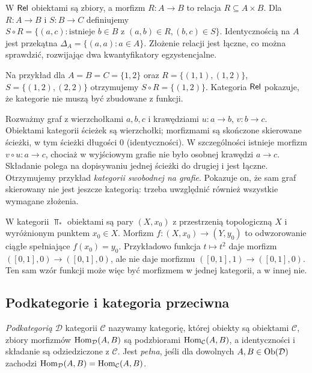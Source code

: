 \begin{przyklad}
W $\mathsf{Rel}$ obiektami są zbiory, a morfizm $R:A\to B$ to relacja $R\subseteq A\times B$. Dla $R:A\to B$ i $S:B\to C$ definiujemy $S\circ R=\{(a,c):\text{istnieje }b\in B\text{ z }(a,b)\in R,(b,c)\in S\}$. Identycznością na $A$ jest przekątna $\Delta_A=\{(a,a):a\in A\}$. Złożenie relacji jest łączne, co można sprawdzić, rozwijając dwa kwantyfikatory egzystencjalne.

Na przykład dla $A=B=C=\{1,2\}$ oraz $R=\{(1,1),(1,2)\}$, $S=\{(1,2),(2,2)\}$ otrzymujemy $S\circ R=\{(1,2)\}$. Kategoria $\mathsf{Rel}$ pokazuje, że kategorie nie muszą być zbudowane z funkcji.
\end{przyklad}


\begin{przyklad}\label{przyklad:sciezki}
Rozważmy graf z wierzchołkami $a,b,c$ i krawędziami $u:a\to b$, $v:b\to c$. Obiektami kategorii ścieżek są wierzchołki; morfizmami są skończone skierowane ścieżki, w tym ścieżki długości $0$ (identyczności). W szczególności istnieje morfizm $v\circ u:a\to c$, chociaż w wyjściowym grafie nie było osobnej krawędzi $a\to c$. Składanie polega na dopisywaniu jednej ścieżki do drugiej i jest łączne. Otrzymujemy przykład \emph{kategorii swobodnej na grafie}. Pokazuje on, że sam graf skierowany nie jest jeszcze kategorią: trzeba uwzględnić również wszystkie wymagane złożenia.
\end{przyklad}

\begin{przyklad}
W kategorii $\Top_*$ obiektami są pary $(X,x_0)$ z przestrzenią topologiczną $X$ i wyróżnionym punktem $x_0\in X$. Morfizm $f:(X,x_0)\to(Y,y_0)$ to odwzorowanie ciągłe spełniające $f(x_0)=y_0$. Przykładowo funkcja $t\mapsto t^2$ daje morfizm $([0,1],0)\to([0,1],0)$, ale nie daje morfizmu $([0,1],1)\to([0,1],0)$. Ten sam wzór funkcji może więc być morfizmem w jednej kategorii, a w innej nie.
\end{przyklad}






\subsection{Podkategorie i kategoria przeciwna}

\begin{definicja}[Podkategoria]
\emph{Podkategorią} $\mathcal D$ kategorii $\mathcal C$ nazywamy kategorię, której obiekty są obiektami $\mathcal C$, zbiory morfizmów $\operatorname{Hom}_{\mathcal D}(A,B)$ są podzbiorami $\operatorname{Hom}_{\mathcal C}(A,B)$, a identyczności i składanie są odziedziczone z $\mathcal C$. Jest \emph{pełna}, jeśli dla dowolnych $A,B\in\operatorname{Ob}(\mathcal D)$ zachodzi $\operatorname{Hom}_{\mathcal D}(A,B)=\operatorname{Hom}_{\mathcal C}(A,B)$.
\end{definicja}

